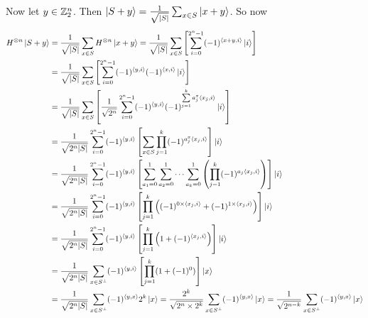 \documentclass[a4paper, 11pt]{article}
\begin{document}
{	Now let $y\in \mathbb{Z}_2^n$. Then $\ket{S+y}=\frac1{\sqrt{|S|}}\sum_{x\in S}\ket{x+y}$. So now
	\begin{align*}
		H^{\otimes n}\ket{S+y} & =\frac1{\sqrt{|S|}}\sum_{x\in S}H^{\otimes n}\ket{x+y}  =\frac1{\sqrt{|S|}}\sum_{x\in S}\left[\sum_{i=0}^{2^n-1}(-1)^{\langle x+y,i\rangle}\ket{i}  \right]                                                                              \\
		                       & =\frac1{\sqrt{|S|}}\sum_{x\in S}\left[\sum_{i=0}^{2^n-1}(-1)^{\langle y,i\rangle}(-1)^{\langle x,i\rangle}\ket{i}  \right]                                                                                                                       \\
		                       & =\frac1{\sqrt{|S|}}\sum_{x\in S}\left[\frac{1}{\sqrt{2^n}} \sum_{i=0}^{2^n-1}(-1)^{\langle y,i\rangle} (-1)^{\sum\limits_{j=1}^ka_j^x\langle x_j,i\rangle}\ket{i} \right]                                                                        \\
		                       & =\frac1{\sqrt{2^n|S|}}\sum_{i=0}^{2^n-1}(-1)^{\langle y,i\rangle}\left[ \sum_{x\in S}\prod_{j=1}^k(-1)^{a_j^x\langle x_j,i\rangle} \right]\ket{i}                                                                                                \\
		                       & =\frac1{\sqrt{2^n|S|}}\sum_{i=0}^{2^n-1}(-1)^{\langle y,i\rangle}\left[ \sum_{a_1=0}^1 \sum_{a_2=0}^1\cdots \sum_{a_k=0}^1 \left(\prod_{j=1}^k(-1)^{a_j\langle x_j,i\rangle} \right)\right]\ket{i}                                                    \\
		                       & =\frac1{\sqrt{2^n|S|}}\sum_{i=0}^{2^n-1} (-1)^{\langle y,i\rangle}\left[\prod_{j=1}^k \left((-1)^{0\times \langle x_j,i\rangle}+(-1)^{1\times \langle x_j,i\rangle}\right)  \right]\ket{i}                                                                    \\
		                       & =\frac1{\sqrt{2^n|S|}}\sum_{i=0}^{2^n-1} (-1)^{\langle y,i\rangle}\left[\prod_{j=1}^k \left(1+(-1)^{ \langle x_j,i\rangle}\right)  \right]\ket{i}                                                                                                     \\
		                       & =\frac1{\sqrt{2^n|S|}}\sum_{x\in S^{\perp}}(-1)^{\langle y,i\rangle} \left[ \prod_{j=1}^k (1+(-1)^0) \right]\ket{x}                                                                                                                      \\
		                       & =\frac1{\sqrt{2^n|S|}}\sum_{x\in S^{\perp}}(-1)^{\langle y,x\rangle}2^k\ket{x}   =\frac{2^k}{\sqrt{2^n\times 2^k}}\sum_{x\in S^{\perp}}(-1)^{\langle y,x\rangle}\ket{x}=\frac1{\sqrt{2^{n-k}}}\sum_{x\in S^{\perp}}(-1)^{\langle y,x\rangle}\ket{x}
	\end{align*}
}

	
\end{document}
